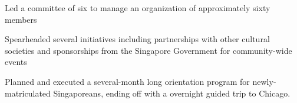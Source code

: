 \begin{cvitemize}
\item Led a committee of six to manage an organization of approximately sixty members
\item Spearheaded several initiatives including partnerships with other cultural societies and sponsorships from the Singapore Government for community-wide events
\item Planned and executed a several-month long orientation program for newly-matriculated Singaporeans, ending off with a overnight guided trip to Chicago.
\end{cvitemize}
